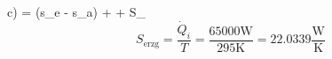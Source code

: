 c)   =  (s_e - s_a) +  + S_{}
\[
S_{\text{erzg}} = \frac{\dot{Q}_i}{T} = \frac{65000 \text{W}}{295 \text{K}} = 22.0339 \frac{\text{W}}{\text{K}}
\]